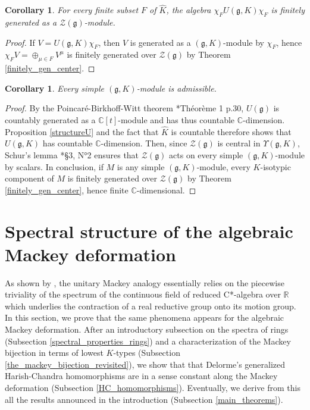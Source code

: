 \documentclass{amsart}
\newtheorem{corollary}[theorem]{Corollary}
\theoremstyle{definition}
\begin{document}
\begin{corollary}\label{finite_generacy_chiUchi}
    For every finite subset $F$ of $\widehat{K}$, the algebra $\chi_F U(\bm{\mathfrak{g}},K) \chi_F$ is finitely generated as a $\mathcal{Z}(\bm{\mathfrak{g}})$-module.
\end{corollary}

\begin{proof}
    If $V = U(\bm{\mathfrak{g}},K)\chi_F$, then $V$ is generated as a $(\bm{\mathfrak{g}},K)$-module by $\chi_F$, hence $\chi_F V = \oplus_{\mu \in F}V^\mu$ is finitely generated over $\mathcal{Z}(\bm{\mathfrak{g}})$ by Theorem \ref{finitely_gen_center}.
\end{proof}

\begin{corollary}\label{admissibility_simple}
    Every simple $(\bm{\mathfrak{g}},K)$-module is admissible.
\end{corollary}

\begin{proof}
    By the Poincaré-Birkhoff-Witt theorem \cite{GrAlLie1}*{Théorème 1 p.30}, $U(\bm{\mathfrak{g}})$ is countably generated as a $\mathbb{C}[t]$-module and has thus countable $\mathbb{C}$-dimension. Proposition \ref{structureU} and the fact that $\widehat{K}$ is countable therefore shows that $U(\bm{\mathfrak{g}},K)$ has countable $\mathbb{C}$-dimension. Then, since $\mathcal{Z}(\bm{\mathfrak{g}})$ is central in $\Upsilon(\bm{\mathfrak{g}},K)$, Schur's lemma \cite{Bourbaki}*{§3, N°2} ensures that $\mathcal{Z}(\bm{\mathfrak{g}})$ acts on every simple $(\bm{\mathfrak{g}},K)$-module by scalars. In conclusion, if $M$ is any simple $(\bm{\mathfrak{g}},K)$-module, every $K$-isotypic component of $M$ is finitely generated over $\mathcal{Z}(\bm{\mathfrak{g}})$ by Theorem \ref{finitely_gen_center}, hence finite $\mathbb{C}$-dimensional.
\end{proof}

\section{Spectral structure of the algebraic Mackey deformation}\label{sec3}

As shown by \cites{Afgoustidis3,AfgoustidisClare}, the unitary Mackey analogy essentially relies on the piecewise triviality of the spectrum of the continuous field of reduced C*-algebra over $\mathbb{R}$ which underlies the contraction of a real reductive group onto its motion group. In this section, we prove that the same phenomena appears for the algebraic Mackey deformation. After an introductory subsection on the spectra of rings (Subsection \ref{spectral_properties_rings}) and a characterization of the Mackey bijection in terms of lowest $K$-types (Subsection \ref{the_mackey_bijection_revisited}), we show that that Delorme's generalized Harish-Chandra homomorphisms \cite{Delorme84} are in a sense constant along the Mackey deformation (Subsection \ref{HC_homomorphisms}). Eventually, we derive from this all the results announced in the introduction (Subsection \ref{main_theorems}).
\end{document}
